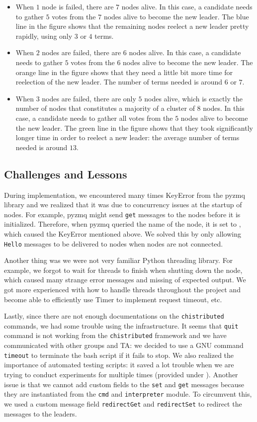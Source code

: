 \documentclass[11pt]{article}
\begin{document}
\begin{itemize}
    \item When $1$ node is failed, there are $7$ nodes alive. In this case, a candidate needs to gather $5$ votes from the $7$ nodes alive to become the new leader. The blue line in the figure shows that the remaining nodes reelect a new leader pretty rapidly, using only $3$ or $4$ terms.
    \item When $2$ nodes are failed, there are $6$ nodes alive. In this case, a candidate needs to gather $5$ votes from the $6$ nodes alive to become the new leader. The orange line in the figure shows that they need a little bit more time for reelection of the new leader. The number of terms needed is around $6$ or $7$.
    \item When $3$ nodes are failed, there are only $5$ nodes alive, which is exactly the number of nodes that constitutes a majority of a cluster of $8$ nodes. In this case, a candidate needs to gather all votes from the $5$ nodes alive to become the new leader. The green line in the figure shows that they took significantly longer time in order to reelect a new leader: the average number of terms needed is around $13$.
\end{itemize}

\subsection{Challenges and Lessons}
During implementation, we encountered many times KeyError from the pyzmq library and we realized that it was due to concurrency issues at the startup of nodes. For example, pyzmq might send \texttt{get} messages to the nodes before it is initialized. Therefore, when pyzmq queried the name of the node, it is set to , which caused the KeyError mentioned above. We solved this by only allowing \texttt{Hello} messages to be delivered to nodes when nodes are not connected. 

Another thing was we were not very familiar Python threading library. For example, we forgot to wait for threads to finish when shutting down the node, which caused many strange error messages and missing of expected output. We got more experienced with how to handle threads throughout the project and become able to efficiently use Timer to implement request timeout, etc.

Lastly, since there are not enough documentations on the \texttt{chistributed} commands, we had some trouble using the infrastructure. It seems that \texttt{quit} command is not working from the \texttt{chistributed} framework and we have communicated with other groups and TA: we decided to use a GNU command \texttt{timeout} to terminate the bash script if it fails to stop. We also realized the importance of automated testing scripts: it saved a lot trouble when we are trying to conduct experiments for multiple times (provided under ). Another issue is that we cannot add custom fields to the \texttt{set} and \texttt{get} messages because they are instantiated from the \texttt{cmd} and \texttt{interpreter} module. To circumvent this, we used a custom message field \texttt{redirectGet} and \texttt{redirectSet} to redirect the messages to the leaders.
\end{document}
